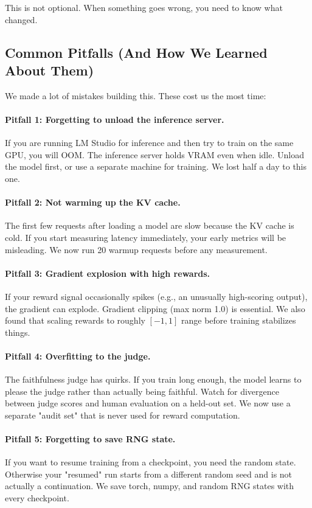 \documentclass[11pt]{article}
\begin{document}
This is not optional.
When something goes wrong, you need to know what changed.

\subsection{Common Pitfalls (And How We Learned About Them)}

We made a lot of mistakes building this.
These cost us the most time:

\paragraph{Pitfall 1: Forgetting to unload the inference server.}
If you are running LM Studio for inference and then try to train on the same GPU, you will OOM.
The inference server holds VRAM even when idle.
Unload the model first, or use a separate machine for training.
We lost half a day to this one.

\paragraph{Pitfall 2: Not warming up the KV cache.}
The first few requests after loading a model are slow because the KV cache is cold.
If you start measuring latency immediately, your early metrics will be misleading.
We now run 20 warmup requests before any measurement.

\paragraph{Pitfall 3: Gradient explosion with high rewards.}
If your reward signal occasionally spikes (e.g., an unusually high-scoring output), the gradient can explode.
Gradient clipping (max norm 1.0) is essential.
We also found that scaling rewards to roughly $[-1, 1]$ range before training stabilizes things.

\paragraph{Pitfall 4: Overfitting to the judge.}
The faithfulness judge has quirks.
If you train long enough, the model learns to please the judge rather than actually being faithful.
Watch for divergence between judge scores and human evaluation on a held-out set.
We now use a separate "audit set" that is never used for reward computation.

\paragraph{Pitfall 5: Forgetting to save RNG state.}
If you want to resume training from a checkpoint, you need the random state.
Otherwise your "resumed" run starts from a different random seed and is not actually a continuation.
We save torch, numpy, and random RNG states with every checkpoint.
\end{document}

